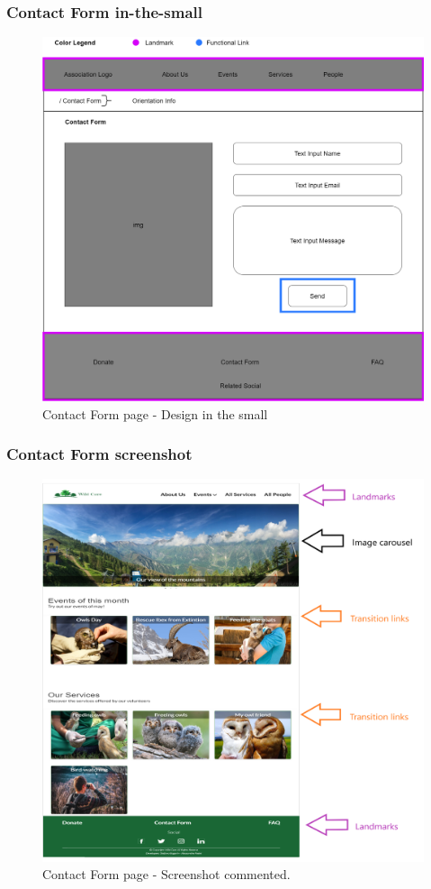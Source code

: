 \subsubsection{Contact Form in-the-small}
\begin{figure}[h!]
	\centering
	\begin{minipage}[b]{1\textwidth}
    		\includegraphics[width=\textwidth]{./assets/contactform.png}
		\caption{Contact Form page - Design in the small}
	\end{minipage}
\end{figure}
\FloatBarrier

\clearpage

\subsubsection{Contact Form screenshot}
\begin{figure}[h!]
	\centering
	\begin{minipage}[b]{1\textwidth}
    		\includegraphics[width=\textwidth]{./assets/mockups/homepage_commented.png}
		\caption{Contact Form page - Screenshot commented.}
	\end{minipage}
\end{figure}
\FloatBarrier
